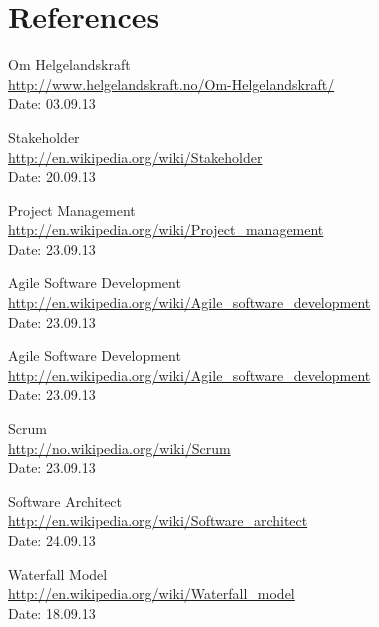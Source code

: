 \chapter{References}

\begin{thebibliography}{99}


	Om Helgelandskraft \\
	\href {http://www.helgelandskraft.no/Om-Helgelandskraft/}{http://www.helgelandskraft.no/Om-Helgelandskraft/} \\
	Date: 03.09.13

	Stakeholder \\
	\href{http://en.wikipedia.org/wiki/Stakeholder}{http://en.wikipedia.org/wiki/Stakeholder} \\
	Date: 20.09.13

	Project Management \\
	\href{http://en.wikipedia.org/wiki/Project_management}{http://en.wikipedia.org/wiki/Project\_management} \\
	Date: 23.09.13

	Agile Software Development \\
	\href{http://en.wikipedia.org/wiki/Agile_software_development}{http://en.wikipedia.org/wiki/Agile\_software\_development} \\
	Date: 23.09.13

	Agile Software Development \\
	\href {http://en.wikipedia.org/wiki/Agile_software_development}{http://en.wikipedia.org/wiki/Agile\_software\_development} \\
	Date: 23.09.13

	Scrum \\ 
	\href{http://no.wikipedia.org/wiki/Scrum}{http://no.wikipedia.org/wiki/Scrum} \\
	Date: 23.09.13

	Software Architect \\
	\href{http://en.wikipedia.org/wiki/Software_architect}{http://en.wikipedia.org/wiki/Software\_architect} \\
	Date: 24.09.13

	Waterfall Model \\
	\href {http://en.wikipedia.org/wiki/Waterfall_model}{http://en.wikipedia.org/wiki/Waterfall\_model} \\
	Date: 18.09.13


\end{thebibliography}
